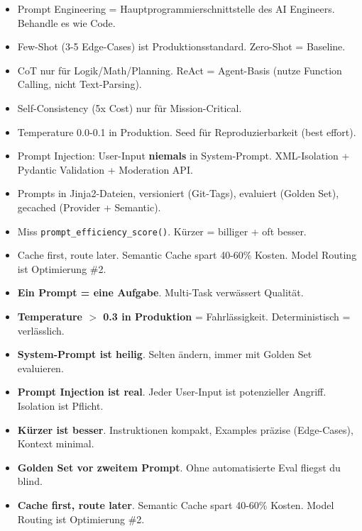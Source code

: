 \begin{itemize}
    \item Prompt Engineering = Hauptprogrammierschnittstelle des AI Engineers. Behandle es wie Code.
    \item Few-Shot (3-5 Edge-Cases) ist Produktionsstandard. Zero-Shot = Baseline.
    \item CoT nur für Logik/Math/Planning. ReAct = Agent-Basis (nutze Function Calling, nicht Text-Parsing).
    \item Self-Consistency (5x Cost) nur für Mission-Critical.
    \item Temperature 0.0-0.1 in Produktion. Seed für Reproduzierbarkeit (best effort).
    \item Prompt Injection: User-Input \textbf{niemals} in System-Prompt. XML-Isolation + Pydantic Validation + Moderation API.
    \item Prompts in Jinja2-Dateien, versioniert (Git-Tags), evaluiert (Golden Set), gecached (Provider + Semantic).
    \item Miss \texttt{prompt\_efficiency\_score()}. Kürzer = billiger + oft besser.
    \item Cache first, route later. Semantic Cache spart 40-60\% Kosten. Model Routing ist Optimierung \#2.
\end{itemize}




\par\mbox{}\par
\begin{merkeEnv}
\begin{itemize}
    \item \textbf{Ein Prompt = eine Aufgabe}. Multi-Task verwässert Qualität.
    \item \textbf{Temperature $>$ 0.3 in Produktion} = Fahrlässigkeit. Deterministisch = verlässlich.
    \item \textbf{System-Prompt ist heilig}. Selten ändern, immer mit Golden Set evaluieren.
    \item \textbf{Prompt Injection ist real}. Jeder User-Input ist potenzieller Angriff. Isolation ist Pflicht.
    \item \textbf{Kürzer ist besser}. Instruktionen kompakt, Examples präzise (Edge-Cases), Kontext minimal.
    \item \textbf{Golden Set vor zweitem Prompt}. Ohne automatisierte Eval fliegst du blind.
    \item \textbf{Cache first, route later}. Semantic Cache spart 40-60\% Kosten. Model Routing ist Optimierung \#2.
\end{itemize}
\end{merkeEnv}

